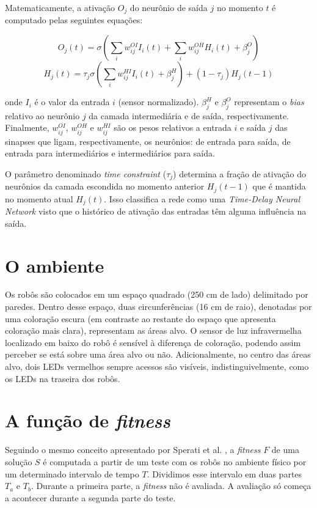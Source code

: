 Matematicamente, a ativação $O_{j}$ do neurônio de saída $j$ no momento $t$ é computado pelas seguintes equações:

$$
O_{j}(t) = \sigma (\sum_{i} w_{ij}^{OI} I_{i}(t) + \sum_{i} w_{ij}^{OH} H_{i}(t) + \beta_{j}^{O})
$$
$$
H_{j}(t) = \tau_{j} \sigma (\sum_{i} w_{ij}^{HI} I_{i}(t) + \beta_{j}^{H}) + (1 - \tau_{j}) H_{j} (t - 1)
$$

onde $I_{i}$ é o valor da entrada $i$ (sensor normalizado). $\beta_{j}^{H}$ e $\beta_{j}^{O}$  representam o \textit{bias} relativo ao neurônio $j$ da camada intermediária e de saída, respectivamente. Finalmente, $w_{ij}^{OI}$, $w_{ij}^{OH}$ e $w_{ij}^{HI}$ são os pesos relativos a entrada $i$ e saída $j$ das sinapses que ligam, respectivamente, os neurônios: de entrada para saída, de entrada para intermediários e intermediários para saída.

O parâmetro denominado \textit{time constraint} ($\tau_{j}$) determina a fração de ativação do neurônios da camada escondida no momento anterior $H_{j} (t - 1)$ que é mantida no momento atual $H_{j} (t)$. Isso classifica a rede como uma \textit{Time-Delay Neural Network} visto que o histórico de ativação das entradas têm alguma influência na saída.

\section{O ambiente}

Os robôs são colocados em um espaço quadrado (250 cm de lado) delimitado por paredes. Dentro desse espaço, duas circunferências (16 cm de raio), denotadas por uma coloração escura (em contraste ao restante do espaço que apresenta coloração mais clara), representam as áreas alvo. O sensor de luz infravermelha localizado em baixo do robô é sensível à diferença de coloração, podendo assim perceber se está sobre uma área alvo ou não. Adicionalmente, no centro das áreas alvo, dois LEDs vermelhos sempre acessos são visíveis, indistinguivelmente, como os LEDs na traseira dos robôs.

\section{A função de \textit{fitness}}
\label{sec:fitness}

Seguindo o mesmo conceito apresentado por Sperati et al. \cite{sperati2011path}, a \textit{fitness} $F$ de uma solução $S$ é computada a partir de um teste com os robôs no ambiente físico por um determinado intervalo de tempo $T$. Dividimos esse intervalo em duas partes $T_{a}$ e $T_{b}$. Durante a primeira parte, a \textit{fitness} não é avaliada. A avaliação só começa a acontecer durante a segunda parte do teste.

